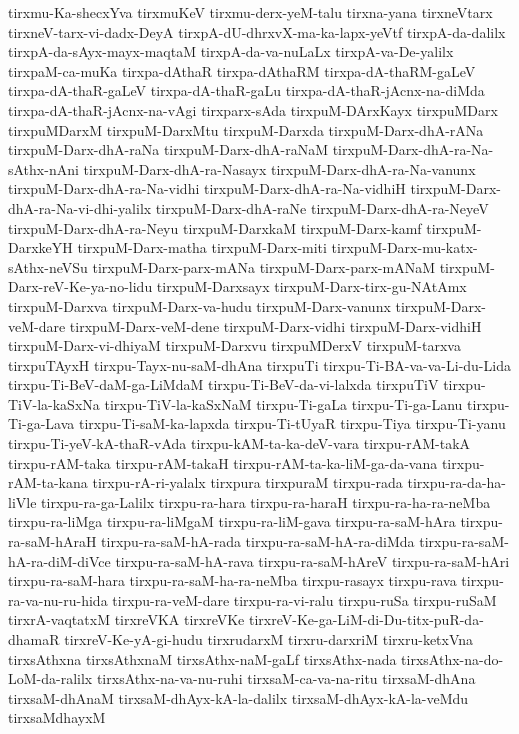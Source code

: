 {tirxmu-Ka-shecxYva
tirxmuKeV
tirxmu-derx-yeM-talu
tirxna-yana
tirxneVtarx
tirxneV-tarx-vi-dadx-DeyA
tirxpA-dU-dhrxvX-ma-ka-lapx-yeVtf
tirxpA-da-dalilx
tirxpA-da-sAyx-mayx-maqtaM
tirxpA-da-va-nuLaLx
tirxpA-va-De-yalilx
tirxpaM-ca-muKa
tirxpa-dAthaR
tirxpa-dAthaRM
tirxpa-dA-thaRM-gaLeV
tirxpa-dA-thaR-gaLeV
tirxpa-dA-thaR-gaLu
tirxpa-dA-thaR-jAcnx-na-diMda
tirxpa-dA-thaR-jAcnx-na-vAgi
tirxparx-sAda
tirxpuM-DArxKayx
tirxpuMDarx
tirxpuMDarxM
tirxpuM-DarxMtu
tirxpuM-Darxda
tirxpuM-Darx-dhA-rANa
tirxpuM-Darx-dhA-raNa
tirxpuM-Darx-dhA-raNaM
tirxpuM-Darx-dhA-ra-Na-sAthx-nAni
tirxpuM-Darx-dhA-ra-Nasayx
tirxpuM-Darx-dhA-ra-Na-vanunx
tirxpuM-Darx-dhA-ra-Na-vidhi
tirxpuM-Darx-dhA-ra-Na-vidhiH
tirxpuM-Darx-dhA-ra-Na-vi-dhi-yalilx
tirxpuM-Darx-dhA-raNe
tirxpuM-Darx-dhA-ra-NeyeV
tirxpuM-Darx-dhA-ra-Neyu
tirxpuM-DarxkaM
tirxpuM-Darx-kamf
tirxpuM-DarxkeYH
tirxpuM-Darx-matha
tirxpuM-Darx-miti
tirxpuM-Darx-mu-katx-sAthx-neVSu
tirxpuM-Darx-parx-mANa
tirxpuM-Darx-parx-mANaM
tirxpuM-Darx-reV-Ke-ya-no-lidu
tirxpuM-Darxsayx
tirxpuM-Darx-tirx-gu-NAtAmx
tirxpuM-Darxva
tirxpuM-Darx-va-hudu
tirxpuM-Darx-vanunx
tirxpuM-Darx-veM-dare
tirxpuM-Darx-veM-dene
tirxpuM-Darx-vidhi
tirxpuM-Darx-vidhiH
tirxpuM-Darx-vi-dhiyaM
tirxpuM-Darxvu
tirxpuMDerxV
tirxpuM-tarxva
tirxpuTAyxH
tirxpu-Tayx-nu-saM-dhAna
tirxpuTi
tirxpu-Ti-BA-va-va-Li-du-Lida
tirxpu-Ti-BeV-daM-ga-LiMdaM
tirxpu-Ti-BeV-da-vi-lalxda
tirxpuTiV
tirxpu-TiV-la-kaSxNa
tirxpu-TiV-la-kaSxNaM
tirxpu-Ti-gaLa
tirxpu-Ti-ga-Lanu
tirxpu-Ti-ga-Lava
tirxpu-Ti-saM-ka-lapxda
tirxpu-Ti-tUyaR
tirxpu-Tiya
tirxpu-Ti-yanu
tirxpu-Ti-yeV-kA-thaR-vAda
tirxpu-kAM-ta-ka-deV-vara
tirxpu-rAM-takA
tirxpu-rAM-taka
tirxpu-rAM-takaH
tirxpu-rAM-ta-ka-liM-ga-da-vana
tirxpu-rAM-ta-kana
tirxpu-rA-ri-yalalx
tirxpura
tirxpuraM
tirxpu-rada
tirxpu-ra-da-ha-liVle
tirxpu-ra-ga-Lalilx
tirxpu-ra-hara
tirxpu-ra-haraH
tirxpu-ra-ha-ra-neMba
tirxpu-ra-liMga
tirxpu-ra-liMgaM
tirxpu-ra-liM-gava
tirxpu-ra-saM-hAra
tirxpu-ra-saM-hAraH
tirxpu-ra-saM-hA-rada
tirxpu-ra-saM-hA-ra-diMda
tirxpu-ra-saM-hA-ra-diM-diVce
tirxpu-ra-saM-hA-rava
tirxpu-ra-saM-hAreV
tirxpu-ra-saM-hAri
tirxpu-ra-saM-hara
tirxpu-ra-saM-ha-ra-neMba
tirxpu-rasayx
tirxpu-rava
tirxpu-ra-va-nu-ru-hida
tirxpu-ra-veM-dare
tirxpu-ra-vi-ralu
tirxpu-ruSa
tirxpu-ruSaM
tirxrA-vaqtatxM
tirxreVKA
tirxreVKe
tirxreV-Ke-ga-LiM-di-Du-titx-puR-da-dhamaR
tirxreV-Ke-yA-gi-hudu
tirxrudarxM
tirxru-darxriM
tirxru-ketxVna
tirxsAthxna
tirxsAthxnaM
tirxsAthx-naM-gaLf
tirxsAthx-nada
tirxsAthx-na-do-LoM-da-ralilx
tirxsAthx-na-va-nu-ruhi
tirxsaM-ca-va-na-ritu
tirxsaM-dhAna
tirxsaM-dhAnaM
tirxsaM-dhAyx-kA-la-dalilx
tirxsaM-dhAyx-kA-la-veMdu
tirxsaMdhayxM
}
